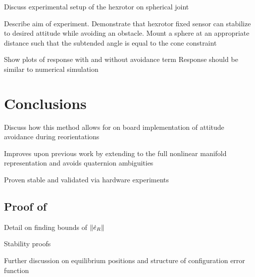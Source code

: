 \documentclass[letterpaper, 10 pt, conference]{ieeeconf}  %
\begin{document}
Discuss experimental setup of the hexrotor on spherical joint

Describe aim of experiment. 
Demonstrate that hexrotor fixed sensor can stabilize to desired attitude while avoiding an obstacle.
Mount a sphere at an appropriate distance such that the subtended angle is equal to the cone constraint

Show plots of response with and without avoidance term
Response should be similar to numerical simulation

\section{Conclusions}

Discuss how this method allows for on board implementation of attitude avoidance during reorientations

Improves upon previous work by extending to the full nonlinear manifold representation and avoids quaternion ambiguities

Proven stable and validated via hardware experiments

\addtolength{\textheight}{-12cm}   %







\appendix
\subsection{Proof of}

Detail on finding bounds of \( \left\| \dot{e}_R \right\| \)

Stability proofs

Further discussion on equilibrium positions and structure of configuration error function






\end{document}
